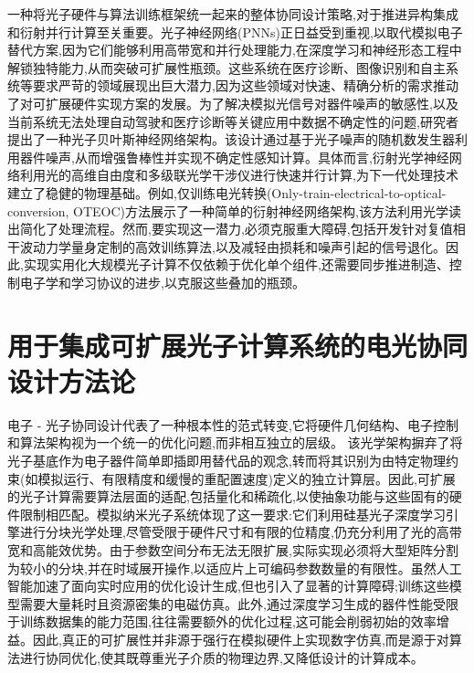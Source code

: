 一种将光子硬件与算法训练框架统一起来的整体协同设计策略,对于推进异构集成和衍射并行计算至关重要。光子神经网络(PNNs)正日益受到重视,以取代模拟电子替代方案,因为它们能够利用高带宽和并行处理能力,在深度学习和神经形态工程中解锁独特能力,从而突破可扩展性瓶颈。这些系统在医疗诊断、图像识别和自主系统等要求严苛的领域展现出巨大潜力,因为这些领域对快速、精确分析的需求推动了对可扩展硬件实现方案的发展。为了解决模拟光信号对器件噪声的敏感性,以及当前系统无法处理自动驾驶和医疗诊断等关键应用中数据不确定性的问题,研究者提出了一种光子贝叶斯神经网络架构。该设计通过基于光子噪声的随机数发生器利用器件噪声,从而增强鲁棒性并实现不确定性感知计算。\citep{doi_10_1002_advs_202500525_74e7146e}具体而言,衍射光学神经网络利用光的高维自由度和多级联光学干涉仪进行快速并行计算,为下一代处理技术建立了稳健的物理基础。例如,仅训练电光转换(Only-train-electrical-to-optical-conversion, OTEOC)方法展示了一种简单的衍射神经网络架构,该方法利用光学读出简化了处理流程。\citep{doi_10_1364_oe_462370_1269b480}然而,要实现这一潜力,必须克服重大障碍,包括开发针对复值相干波动力学量身定制的高效训练算法,以及减轻由损耗和噪声引起的信号退化。因此,实现实用化大规模光子计算不仅依赖于优化单个组件,还需要同步推进制造、控制电子学和学习协议的进步,以克服这些叠加的瓶颈。\citep{doi_10_3390_nano14080697_c372a140} \citep{s2_b765388f3cc18d6e5a0507522822def0e3503ec6_fa09b483}

\section{用于集成可扩展光子计算系统的电光协同设计方法论}\label{ux7528ux4e8eux96c6ux6210ux53efux6269ux5c55ux5149ux5b50ux8ba1ux7b97ux7cfbux7edfux7684ux7535ux5149ux534fux540cux8bbeux8ba1ux65b9ux6cd5ux8bba}

电子 - 光子协同设计代表了一种根本性的范式转变,它将硬件几何结构、电子控制和算法架构视为一个统一的优化问题,而非相互独立的层级。\citep{doi_10_48550_arxiv_2410_01289_34dceec6} \citep{doi_10_1145_3658617_3697771_aa4ee9ae} 该光学架构摒弃了将光子基底作为电子器件简单即插即用替代品的观念,转而将其识别为由特定物理约束(如模拟运行、有限精度和缓慢的重配置速度)定义的独立计算层。因此,可扩展的光子计算需要算法层面的适配,包括量化和稀疏化,以使抽象功能与这些固有的硬件限制相匹配。模拟纳米光子系统体现了这一要求:它们利用硅基光子深度学习引擎进行分块光学处理,尽管受限于硬件尺寸和有限的位精度,仍充分利用了光的高带宽和高能效优势。由于参数空间分布无法无限扩展,实际实现必须将大型矩阵分割为较小的分块,并在时域展开操作,以适应片上可编码参数数量的有限性。虽然人工智能加速了面向实时应用的优化设计生成,但也引入了显著的计算障碍;训练这些模型需要大量耗时且资源密集的电磁仿真。此外,通过深度学习生成的器件性能受限于训练数据集的能力范围,往往需要额外的优化过程,这可能会削弱初始的效率增益。因此,真正的可扩展性并非源于强行在模拟硬件上实现数字仿真,而是源于对算法进行协同优化,使其既尊重光子介质的物理边界,又降低设计的计算成本。\citep{doi_10_1515_nanoph_2024_0536_4b6631ba} \citep{doi_10_1515_nanoph_2022_0423_38a2c3ec}

